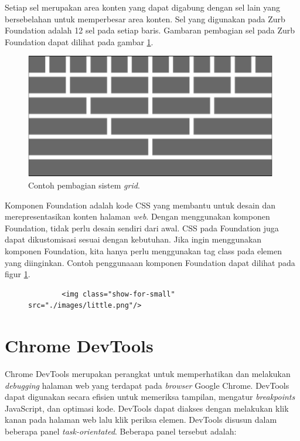 Setiap sel merupakan area konten yang dapat digabung dengan sel lain yang bersebelahan untuk memperbesar area konten. Sel yang digunakan pada Zurb Foundation adalah 12 sel pada setiap baris. Gambaran pembagian sel pada Zurb Foundation dapat dilihat pada gambar \ref{fig:2_zurb_grid}.

\begin{figure}[H]
	\centering
	\includegraphics[scale=0.5]{Gambar/zurb-grid}
	\caption{Contoh pembagian sistem \textit{grid}.} 
	\label{fig:2_zurb_grid}
\end{figure}

Komponen Foundation adalah kode CSS  yang membantu untuk desain dan merepresentasikan konten halaman \textit{web}. Dengan menggunakan komponen Foundation, tidak perlu desain sendiri dari awal. CSS pada Foundation juga dapat dikustomisasi sesuai dengan kebutuhan. Jika ingin menggunakan komponen Foundation, kita hanya perlu menggunakan tag class pada elemen yang diinginkan. Contoh penggunaaan komponen Foundation dapat dilihat pada figur \ref{fig:2_zurb_grid}.

\begin{figure}[H]
	\centering
	
	\begin{lstlisting}
		<img class="show-for-small" src="./images/little.png"/>
	\end{lstlisting}

	\label{fig:2_zurb_contoh}
\end{figure}

\section{Chrome DevTools}
\label{sec:devtools}
Chrome DevTools\cite{devtools} merupakan perangkat untuk memperhatikan dan melakukan \textit{debugging} halaman web yang terdapat pada \textit{browser} Google Chrome. DevTools dapat digunakan secara efisien untuk memeriksa tampilan, mengatur \textit{breakpoints} JavaScript, dan optimasi kode. DevTools dapat diakses dengan melakukan klik kanan pada halaman web lalu klik periksa elemen. DevTools disusun dalam beberapa panel \textit{task-orientated}. Beberapa panel tersebut adalah:

